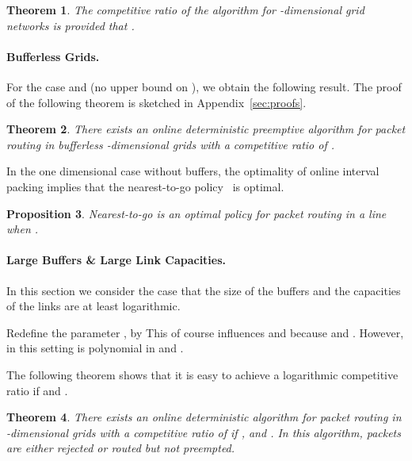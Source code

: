 \documentclass[11pt]{article}
\newtheorem{theorem}{Theorem}
\newtheorem{proposition}[theorem]{Proposition}
\newcommand{\route}{\text{\sc{ipp}}}
\newcommand{\IPP}{\route}
\newenvironment{proof sketch}[1]{\noindent {\emph{Proof sketch of #1:}}}{\hfill \qed}
\begin{document}
\begin{theorem}\label{thm:algd}
  The competitive ratio of the algorithm for -dimensional grid
networks is  provided that .
\end{theorem}
\begin{comment}
  \begin{proof sketch}{Theorem~\ref{thm:algd}}
    Bounding path lengths incurs a constant loss to the competitive
    ratio. Algorithm \IPP\ incurs an additional constant loss to the
    competitive ratio. The capacity assignment of  reduces
    the throughput by a factor of . Finally, preemptions and detailed
    routing in the last tile incur a  loss to the
    competitive ratio. The theorem follows since .
  \end{proof sketch}
\end{comment}
\label{sec:extend}
\paragraph{Bufferless Grids.}
For the case  and  (no upper bound on ), we obtain
the following result. The proof of the following theorem is sketched in Appendix~\ref{sec:proofs}.
\begin{theorem}\label{thm:bufferless}
  There exists an online deterministic preemptive algorithm for packet
  routing in bufferless -dimensional grids with a competitive ratio of .
\end{theorem}

In the one dimensional case without buffers, the optimality of online interval
packing implies that the nearest-to-go policy~\cite{AKOR} is optimal.
\begin{proposition}
Nearest-to-go is an optimal policy for packet routing in a line when .
\end{proposition}

\paragraph{Large Buffers \& Large Link Capacities.}\label{sec:largeBc}
In this section we consider the case that the size of the buffers and the capacities
of the links are at least logarithmic.

Redefine the parameter , by   This of course influences  and 
because  and .
However, in this setting  is polynomial in  and .

The following theorem shows that it is easy to achieve a logarithmic competitive
ratio if  and .
\begin{theorem}\label{thm:largeBc}
  There exists an online deterministic algorithm for packet routing in
  -dimensional grids with a competitive ratio of  if ,
  and . In this algorithm, packets are either rejected or routed but not
  preempted.
\end{theorem}
\end{document}
